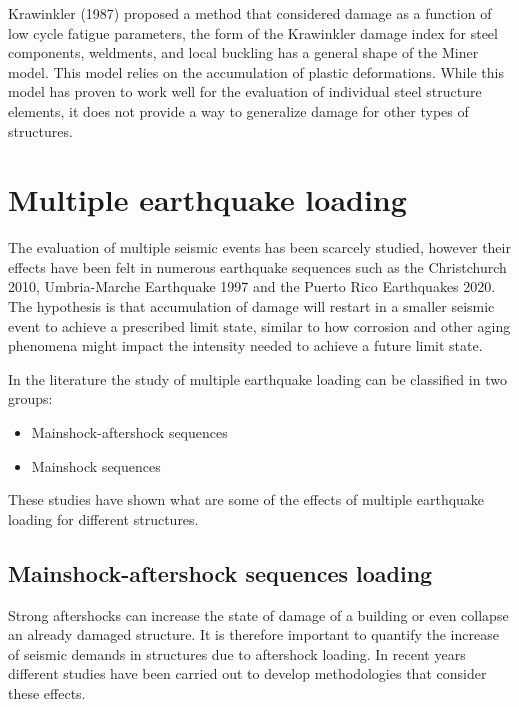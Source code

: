 Krawinkler (1987) \cite{Krawinkler1987} proposed a method that considered damage as a function of low cycle fatigue parameters, the form of the Krawinkler damage index for steel components, weldments, and local buckling has a general shape of the Miner model. This model relies on the accumulation of plastic deformations. While this model has proven to work well for the evaluation of individual steel structure elements, it does not provide a way to generalize damage for other types of structures.


\section{Multiple earthquake loading}

The evaluation of multiple seismic events has been scarcely studied, however their effects have been felt in numerous earthquake sequences such as the Christchurch 2010, Umbria-Marche Earthquake 1997 and the Puerto Rico Earthquakes 2020. The hypothesis is that accumulation of damage will restart in a smaller seismic event to achieve a prescribed limit state, similar to how corrosion and other aging phenomena might impact the intensity needed to achieve a future limit state. 

In the literature the study of multiple earthquake loading can be classified in two groups:

\begin{itemize}
	\item Mainshock-aftershock sequences
	\item Mainshock sequences
\end{itemize}

These studies have shown what are some of the effects of multiple earthquake loading for different structures.

\subsection{Mainshock-aftershock sequences loading }

Strong aftershocks can increase the state of damage of a building or even collapse an already damaged structure. It is therefore important to quantify the increase of seismic demands in structures due to aftershock loading. In recent years different studies have been carried out to develop methodologies that consider these effects.

